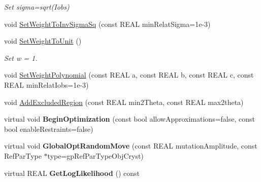 \begin{DoxyCompactItemize}
\begin{DoxyCompactList}\small\item\em Set sigma=sqrt(\+Iobs) \end{DoxyCompactList}\item 
void \mbox{\hyperlink{class_obj_cryst_1_1_powder_pattern_add7d97cdb7610f7553b95c2eeefcd172}{Set\+Weight\+To\+Inv\+Sigma\+Sq}} (const R\+E\+AL min\+Relat\+Sigma=1e-\/3)
\item 
\mbox{\label{class_obj_cryst_1_1_powder_pattern_a57bbc965281ecca08c5f6bc0d0076e00}} 
void \mbox{\hyperlink{class_obj_cryst_1_1_powder_pattern_a57bbc965281ecca08c5f6bc0d0076e00}{Set\+Weight\+To\+Unit}} ()
\begin{DoxyCompactList}\small\item\em Set w = 1. \end{DoxyCompactList}\item 
void \mbox{\hyperlink{class_obj_cryst_1_1_powder_pattern_a3648701bed1a9ba0b576241226e06032}{Set\+Weight\+Polynomial}} (const R\+E\+AL a, const R\+E\+AL b, const R\+E\+AL c, const R\+E\+AL min\+Relat\+Iobs=1e-\/3)
\item 
void \mbox{\hyperlink{class_obj_cryst_1_1_powder_pattern_a964850cf74baa499f823e85447959790}{Add\+Excluded\+Region}} (const R\+E\+AL min2\+Theta, const R\+E\+AL max2theta)
\item 
\mbox{\label{class_obj_cryst_1_1_powder_pattern_ae1dfeb27cc50785a5ee280ec8ead19f2}} 
virtual void {\bfseries Begin\+Optimization} (const bool allow\+Approximations=false, const bool enable\+Restraints=false)
\item 
\mbox{\label{class_obj_cryst_1_1_powder_pattern_a9c9758a1121f31376ca7cb8147f93e16}} 
virtual void {\bfseries Global\+Opt\+Random\+Move} (const R\+E\+AL mutation\+Amplitude, const Ref\+Par\+Type $\ast$type=gp\+Ref\+Par\+Type\+Obj\+Cryst)
\item 
\mbox{\label{class_obj_cryst_1_1_powder_pattern_ab1879f34ea9b5d48122c44f730ba3242}} 
virtual R\+E\+AL {\bfseries Get\+Log\+Likelihood} () const
\item 
\mbox{\label{class_obj_cryst_1_1_powder_pattern_a4ac815895f0bfbe54a86c8c035974429}} 

\end{DoxyCompactItemize}
